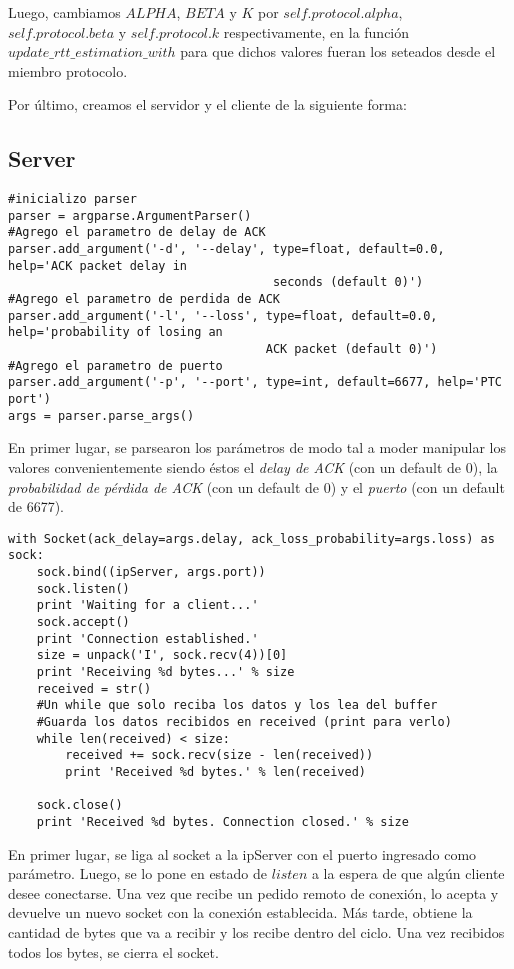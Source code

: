 \documentclass[10pt, a4paper]{article}
\begin{document}
Luego, cambiamos $ALPHA$, $BETA$ y $K$ por $self.protocol.alpha$, $self.protocol.beta$ y $self.protocol.k$ respectivamente, en la función $update\_rtt\_estimation\_with$ para que dichos valores fueran los seteados desde el miembro protocolo.

Por último, creamos el servidor y el cliente de la siguiente forma:

\subsection{Server}
\begin{verbatim}
#inicializo parser
parser = argparse.ArgumentParser()
#Agrego el parametro de delay de ACK
parser.add_argument('-d', '--delay', type=float, default=0.0, help='ACK packet delay in
									 seconds (default 0)')
#Agrego el parametro de perdida de ACK
parser.add_argument('-l', '--loss', type=float, default=0.0, help='probability of losing an 
									ACK packet (default 0)')
#Agrego el parametro de puerto
parser.add_argument('-p', '--port', type=int, default=6677, help='PTC port')
args = parser.parse_args()
\end{verbatim}

En primer lugar, se parsearon los parámetros de modo tal a moder manipular los valores convenientemente siendo éstos el \textit{delay de ACK} (con un default de 0), la \textit{probabilidad de pérdida de ACK} (con un default de 0) y el \textit{puerto} (con un default de 6677).

\begin{verbatim}
with Socket(ack_delay=args.delay, ack_loss_probability=args.loss) as sock:
    sock.bind((ipServer, args.port))
    sock.listen()
    print 'Waiting for a client...'
    sock.accept()
    print 'Connection established.'
    size = unpack('I', sock.recv(4))[0]
    print 'Receiving %d bytes...' % size
    received = str()
    #Un while que solo reciba los datos y los lea del buffer
    #Guarda los datos recibidos en received (print para verlo)
    while len(received) < size:
        received += sock.recv(size - len(received))
        print 'Received %d bytes.' % len(received)

    sock.close()
    print 'Received %d bytes. Connection closed.' % size
\end{verbatim}

En primer lugar, se liga al socket a la ipServer con el puerto ingresado como parámetro. Luego, se lo pone en estado de $listen$ a la espera de que algún cliente desee conectarse. Una vez que recibe un pedido remoto de conexión, lo acepta y devuelve un nuevo socket con la conexión establecida. Más tarde, obtiene la cantidad de bytes que va a recibir y los recibe dentro del ciclo. Una vez recibidos todos los bytes, se cierra el socket.
\end{document}
